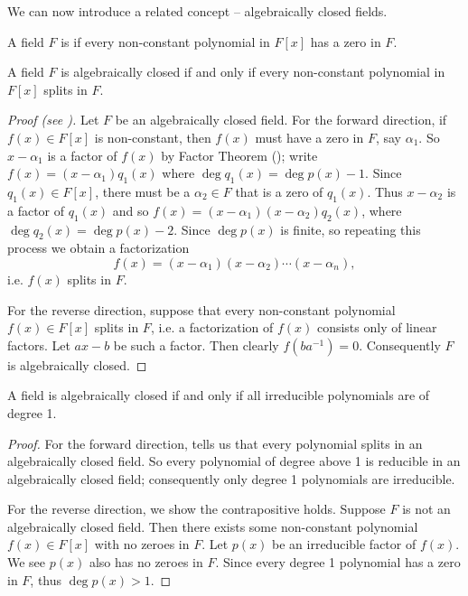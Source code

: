 We can now introduce a related concept -- algebraically closed fields.

\begin{definition}
    A field $F$ is  if every non-constant polynomial in $F[x]$ has a zero in $F$.
\end{definition}

\begin{theorem}\label{thrm-algebraically-closed-iff-polynomials-split-in-field}
    A field $F$ is algebraically closed if and only if every non-constant polynomial in $F[x]$ splits in $F$.
\end{theorem}
\begin{proof}[Proof (see {\cite[Theorem 21.25]{judson_beezer_2022}})]
    Let $F$ be an algebraically closed field. For the forward direction, if $f(x) \in F[x]$ is non-constant, then $f(x)$ must have a zero in $F$, say $\alpha_1$. So $x-\alpha_1$ is a factor of $f(x)$ by Factor Theorem (); write $f(x) = (x-\alpha_1)q_1(x)$ where $\deg q_1(x) = \deg p(x) - 1$. Since $q_1(x) \in F[x]$, there must be a $\alpha_2\in F$ that is a zero of $q_1(x)$. Thus $x-\alpha_2$ is a factor of $q_1(x)$ and so $f(x) = (x-\alpha_1)(x-\alpha_2)q_2(x)$, where $\deg q_2(x) = \deg p(x) - 2$. Since $\deg p(x)$ is finite, so repeating this process we obtain a factorization
    \[
        f(x) = (x-\alpha_1)(x-\alpha_2)\cdots(x-\alpha_n),
    \]
    i.e. $f(x)$ splits in $F$.

    For the reverse direction, suppose that every non-constant polynomial $f(x) \in F[x]$ splits in $F$, i.e. a factorization of $f(x)$ consists only of linear factors. Let $ax-b$ be such a factor. Then clearly $f(ba^{-1}) = 0$. Consequently $F$ is algebraically closed.
\end{proof}

\begin{corollary}\label{corollary-field-is-algebraically-closed-iff-irreducible-polynomials-are-of-degree-1}
    A field is algebraically closed if and only if all irreducible polynomials are of degree 1.
\end{corollary}
\begin{proof}
    For the forward direction,  tells us that every polynomial splits in an algebraically closed field. So every polynomial of degree above 1 is reducible in an algebraically closed field; consequently only degree 1 polynomials are irreducible.

    For the reverse direction, we show the contrapositive holds. Suppose $F$ is not an algebraically closed field. Then there exists some non-constant polynomial $f(x) \in F[x]$ with no zeroes in $F$. Let $p(x)$ be an irreducible factor of $f(x)$. We see $p(x)$ also has no zeroes in $F$. Since every degree 1 polynomial has a zero in $F$, thus $\deg p(x) > 1$.
\end{proof}

